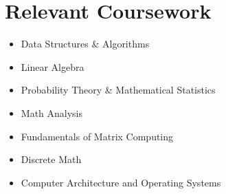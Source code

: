 \section{Relevant Coursework}
\begin{multicols}{4}
    \begin{itemize}[itemsep=0pt, parsep=0pt, leftmargin=*]
        \item Data Structures \& Algorithms
        \item Linear Algebra
        \item Probability Theory \& Mathematical Statistics
        \item Math Analysis
        \item Fundamentals of Matrix Computing
        \item Discrete Math
        \item Computer Architecture and Operating Systems
    \end{itemize}
\end{multicols}
